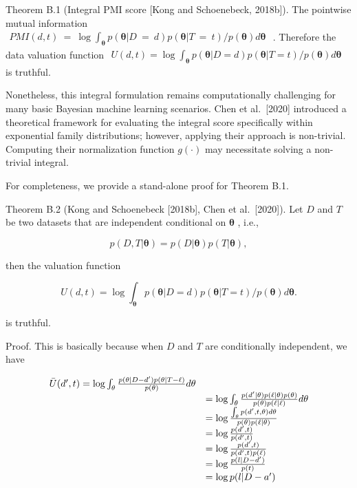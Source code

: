 Theorem B.1 (Integral PMI score {[}Kong and Schoenebeck, 2018b{]}). The
pointwise mutual information
\(\begin{array} { r } { P M I ( d , t ) \ = \ \log \int _ { \pmb { \theta } } p ( \pmb { \theta } | D \ = \ d ) p ( \pmb { \theta } | T \ = \ t ) / p ( \pmb { \theta } ) d \pmb { \theta } } \end{array}\)
. Therefore the data valuation function
\(\begin{array} { r } { U ( d , t ) = \log \int _ { \pmb { \theta } } p ( \pmb { \theta } | D = d ) p ( \pmb { \theta } | T = t ) / p ( \pmb { \theta } ) d \pmb { \theta } } \end{array}\)
is truthful.

Nonetheless, this integral formulation remains computationally
challenging for many basic Bayesian machine learning scenarios. Chen et
al.~{[}2020{]} introduced a theoretical framework for evaluating the
integral score specifically within exponential family distributions;
however, applying their approach is non-trivial. Computing their
normalization function \(g ( \cdot )\) may necessitate solving a
non-trivial integral.

For completeness, we provide a stand-alone proof for Theorem B.1.

Theorem B.2 (Kong and Schoenebeck {[}2018b{]}, Chen et al.~{[}2020{]}).
Let \(D\) and \(T\) be two datasets that are independent conditional on
\(\pmb \theta\) , i.e.,

\[
p ( D , T | \pmb \theta ) = p ( D | \pmb \theta ) p ( T | \pmb \theta ) ,
\]

then the valuation function

\[
U ( d , t ) = \log \int _ { \pmb { \theta } } p ( \pmb { \theta } | D = d ) p ( \pmb { \theta } | T = t ) / p ( \pmb { \theta } ) d \pmb { \theta } .
\]

is truthful.

Proof. This is basically because when \(D\) and \(T\) are conditionally
independent, we have

\[
\begin{array} { r l } { \bar { U } ( d ^ { \prime } , t ) = \log \int _ { \theta } \frac { p ( \theta | D - d ^ { \prime } ) p ( \theta | T - \ell ) } { p ( \theta ) } d \theta } & { } \\ & { = \log \int _ { \theta } \frac { p ( d ^ { \prime } | \theta ) p ( \ell | \theta ) p ( \theta ) } { p ( \theta ) p ( \ell | \ell ) } d \theta } \\ & { = \log \frac { \int _ { \theta } p ( d ^ { \prime } , t , \theta ) d \theta } { p ( \theta ) p ( \ell | \theta ) } } \\ & { = \log \frac { p ( d ^ { \prime } , t ) } { p ( d ^ { \prime } , t ) } } \\ & { = \log \frac { p ( d ^ { \prime } , t ) } { p ( d ^ { \prime } , t ) p ( \ell ) } } \\ & { = \log \frac { p ( l | D - d ^ { \prime } ) } { p ( t ) } } \\ & { = \log p ( l | D - a ^ { \prime } ) } \end{array}
\]

